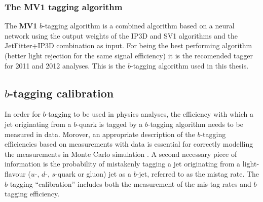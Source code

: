 

\subsubsection{The MV1 tagging algorithm}


The \textbf{MV1} $b$-tagging algorithm is a combined algorithm based on a neural network using the output weights of the IP3D and SV1 algorithms and the JetFitter+IP3D combination as input.  For being the best performing algorithm (better light rejection for the same signal efficiency) it is the recomended tagger for 2011 and 2012 analyses. This is the $b$-tagging algorithm used in this thesis.


\subsection{$b$-tagging calibration}


In order for $b$-tagging to be used in physics analyses, the efficiency with which a jet originating from a $b$-quark is tagged by a $b$-tagging algorithm needs to be measured in data.  Morover, an appropriate description of the $b$-tagging efficiencies based on measurements with data is essential for correctly modelling the measurements in Monte Carlo simulation . A second necessary piece of information is the probability of mistakenly tagging a jet originating from a light-flavour ($u$-, $d$-, $s$-quark or gluon) jet as a $b$-jet, referred to as the mistag rate. The $b$-tagging ``calibration'' includes both the measurement of the mis-tag rates and $b$-tagging efficiency.


